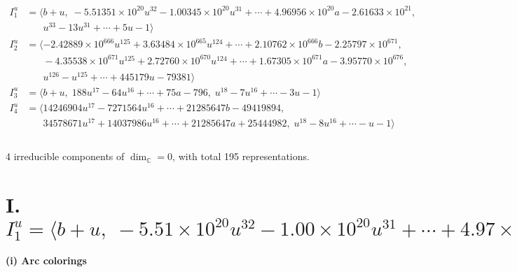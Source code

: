 \documentclass[1p]{elsarticle_modified}
\theoremstyle{definition}
\begin{document}
\begin{align*}
I^u_{1}&=\langle 
b+u,\;-5.51351\times10^{20} u^{32}-1.00345\times10^{20} u^{31}+\cdots+4.96956\times10^{20} a-2.61633\times10^{21},\\
\phantom{I^u_{1}}&\phantom{= \langle  }u^{33}-13 u^{31}+\cdots+5 u-1\rangle \\
I^u_{2}&=\langle 
-2.42889\times10^{666} u^{125}+3.63484\times10^{665} u^{124}+\cdots+2.10762\times10^{666} b-2.25797\times10^{671},\\
\phantom{I^u_{2}}&\phantom{= \langle  }-4.35538\times10^{671} u^{125}+2.72760\times10^{670} u^{124}+\cdots+1.67305\times10^{671} a-3.95770\times10^{676},\\
\phantom{I^u_{2}}&\phantom{= \langle  }u^{126}- u^{125}+\cdots+445179 u-79381\rangle \\
I^u_{3}&=\langle 
b+u,\;188 u^{17}-64 u^{16}+\cdots+75 a-796,\;u^{18}-7 u^{16}+\cdots-3 u-1\rangle \\
I^u_{4}&=\langle 
14246904 u^{17}-7271564 u^{16}+\cdots+21285647 b-49419894,\\
\phantom{I^u_{4}}&\phantom{= \langle  }34578671 u^{17}+14037986 u^{16}+\cdots+21285647 a+25444982,\;u^{18}-8 u^{16}+\cdots- u-1\rangle \\
\\
\end{align*}
\raggedright * 4 irreducible components of $\dim_{\mathbb{C}}=0$, with total 195 representations.\\
\newpage
\renewcommand{\arraystretch}{1}
\centering \section*{I. $I^u_{1}= \langle b+u,\;-5.51\times10^{20} u^{32}-1.00\times10^{20} u^{31}+\cdots+4.97\times10^{20} a-2.62\times10^{21},\;u^{33}-13 u^{31}+\cdots+5 u-1 \rangle$}
\flushleft \textbf{(i) Arc colorings}\\
\end{document}
